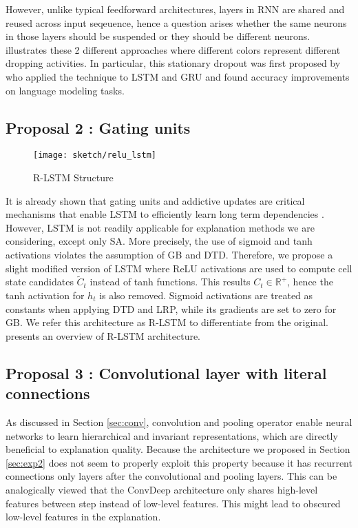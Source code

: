 However, unlike typical feedforward architectures, layers in RNN are shared and reused across input seqeuence, hence a question arises whether the same neurons in those layers should be suspended or they should be different neurons. \addfigure{\ref{fig:dropout_lstm}} illustrates these 2 different approaches where different colors represent different dropping activities. In particular, this stationary dropout was first proposed by \cite{GalTheoreticallyGroundedApplication2016} who applied  the technique to LSTM and GRU and found accuracy improvements on language modeling tasks.

\subsection{Proposal 2 : Gating units}
\begin{figure}[!htb]
\centering
\texttt{[image: sketch/relu\_lstm]}
\caption{R-LSTM Structure} 

\label{fig:relu_lstm} 
\end{figure}

It is already shown that gating units and addictive updates are critical mechanisms that enable LSTM to efficiently learn long term dependencies \cite{GreffLSTMsearchspace2017, Jozefowiczempiricalexplorationrecurrent2015a}. However, LSTM is not readily applicable for explanation methods we are considering, except only SA. More precisely, the use of sigmoid and tanh activations violates the assumption of GB and DTD. Therefore, we propose a slight modified version of LSTM where ReLU activations are used to compute cell state candidates $\widetilde{C}_t$ instead of tanh functions. This results $C_t \in \mathbb{R}^+$, hence the tanh activation for $h_t$  is also removed.  Sigmoid activations are treated as constants when applying DTD and LRP\cite{ArrasExplainingRecurrentNeural2017}, while its gradients are set to zero for GB. We refer this architecture as R-LSTM to differentiate from the original.  \addfigure{\ref{fig:relu_lstm}} presents an overview of R-LSTM architecture.


\subsection{Proposal 3 : Convolutional layer with literal connections}
As discussed in Section \ref{sec:conv}, convolution and pooling operator enable neural networks to learn hierarchical and invariant representations, which are directly beneficial to explanation quality. Because the  architecture we proposed in Section \ref{sec:exp2} does not seem to properly exploit this property because it has recurrent connections only layers after the convolutional and pooling layers. This can be analogically viewed that the ConvDeep architecture only shares high-level features between step instead of low-level features. This might lead to obscured low-level features in the explanation. 

